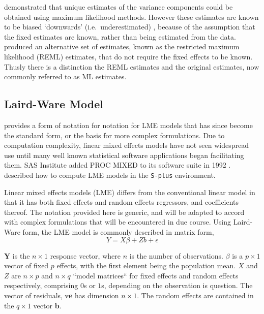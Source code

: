 \documentclass[12pt, a4paper]{report}
\theoremstyle{plain}
\theoremstyle{definition}
\theoremstyle{remark}
\begin{document}
			\citet{HartleyRao} demonstrated that unique estimates of the variance components could be obtained using maximum likelihood methods. However these estimates are known to be biased `downwards' (i.e.\ underestimated) , because of the assumption that the fixed estimates are known, rather than being estimated from the data. \citet{PattersonThompson} produced an alternative set of estimates, known as the restricted maximum likelihood (REML) estimates, that do not require the fixed effects to be known. Thusly there is a distinction the REML estimates and the original estimates, now commonly referred to as ML estimates.
			
	\subsection{Laird-Ware Model} 
	\citet{LW82} provides a form of notation for notation for LME models that has since become the standard form, or the basis for more complex formulations. Due to computation complexity, linear mixed effects models have not seen widespread use until many well known statistical software applications began facilitating them. SAS Institute added PROC MIXED to its software suite in 1992 \citep{singer}. \citet{PB} described how to compute LME models in the \texttt{S-plus} environment.
	
	Linear mixed effects models (LME)
	differs from the conventional linear model in that it has both
	fixed effects and random effects regressors, and coefficients
	thereof. The notation provided here is generic, and will be adapted to accord with complex formulations that will be encountered in due course. Using Laird-Ware form, the LME model is commonly described in matrix form,
	\begin{equation}
	Y = X\beta + Zb + \epsilon
	\label{LW}
	\end{equation}
	
	\textbf{Y} is the $n
	\times 1$ response vector, where  $n$ is the number of observations. \textbf{$\beta$} is a $p \times 1$ vector of fixed $p$ effects, with the
	first element being the population mean. $X$ and $Z$ are $n \times p$ and $n \times q$ ``model matrices`` for fixed effects and random effects respectively, comprising
	$0$s or $1$s, depending on the observation is question. The vector of residuals, v\textbf{e} has
	dimension $n \times 1$. The random effects are contained in the  $q \times
	1$ vector \textbf{b}.
			
			
\end{document}
